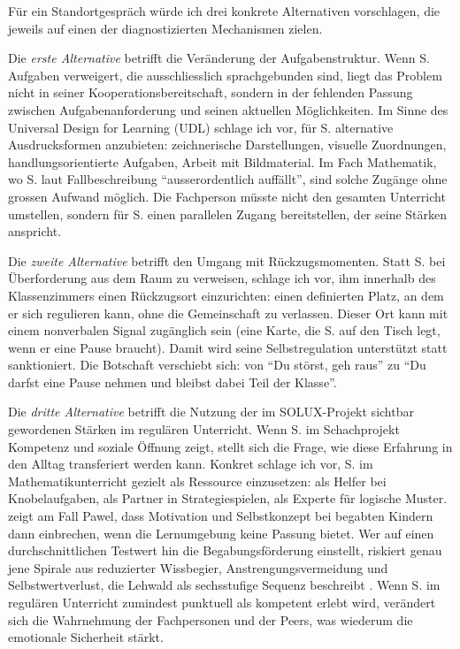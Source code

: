 \documentclass[ngerman, a4paper]{article}
\begin{document}
Für ein Standortgespräch würde ich drei konkrete Alternativen vorschlagen, die
jeweils auf einen der diagnostizierten Mechanismen zielen.

Die \textit{erste Alternative} betrifft die Veränderung der Aufgabenstruktur.
Wenn S. Aufgaben verweigert, die ausschliesslich sprachgebunden sind, liegt
das Problem nicht in seiner Kooperationsbereitschaft, sondern in der fehlenden
Passung zwischen Aufgabenanforderung und seinen aktuellen Möglichkeiten. Im
Sinne des Universal Design for Learning (UDL) schlage ich vor, für S. alternative
Ausdrucksformen anzubieten: zeichnerische Darstellungen, visuelle Zuordnungen,
handlungsorientierte Aufgaben, Arbeit mit Bildmaterial. Im Fach Mathematik, wo
S. laut Fallbeschreibung \enquote{ausserordentlich auffällt}, sind solche Zugänge
ohne grossen Aufwand möglich. Die Fachperson müsste nicht den gesamten Unterricht
umstellen, sondern für S. einen parallelen Zugang bereitstellen, der seine
Stärken anspricht.

Die \textit{zweite Alternative} betrifft den Umgang mit Rückzugsmomenten. Statt
S. bei Überforderung aus dem Raum zu verweisen, schlage ich vor, ihm innerhalb
des Klassenzimmers einen Rückzugsort einzurichten: einen definierten Platz,
an dem er sich regulieren kann, ohne die Gemeinschaft zu verlassen. Dieser Ort
kann mit einem nonverbalen Signal zugänglich sein (eine Karte, die S. auf den
Tisch legt, wenn er eine Pause braucht). Damit wird seine Selbstregulation
unterstützt statt sanktioniert. Die Botschaft verschiebt sich: von
\enquote{Du störst, geh raus} zu \enquote{Du darfst eine Pause nehmen
und bleibst dabei Teil der Klasse}.

Die \textit{dritte Alternative} betrifft die Nutzung der im SOLUX-Projekt
sichtbar gewordenen Stärken im regulären Unterricht. Wenn S. im Schachprojekt
Kompetenz und soziale Öffnung zeigt, stellt sich die Frage, wie diese
Erfahrung in den Alltag transferiert werden kann. Konkret schlage ich vor,
S. im Mathematikunterricht gezielt als Ressource einzusetzen: als Helfer bei
Knobelaufgaben, als Partner in Strategiespielen, als Experte für logische
Muster. \textcite[S.\,57--63]{lehwald2017motivation} zeigt am Fall Pawel,
dass Motivation und Selbstkonzept bei begabten Kindern dann einbrechen,
wenn die Lernumgebung keine Passung bietet. Wer auf einen durchschnittlichen
Testwert hin die Begabungsförderung einstellt, riskiert genau jene Spirale
aus reduzierter Wissbegier, Anstrengungsvermeidung und Selbstwertverlust,
die Lehwald als sechsstufige Sequenz beschreibt
\parencite[S.\,70--72]{lehwald2017motivation}.
Wenn S. im regulären Unterricht zumindest
punktuell als kompetent erlebt wird, verändert sich die Wahrnehmung der
Fachpersonen und der Peers, was wiederum die emotionale Sicherheit stärkt.
\end{document}
